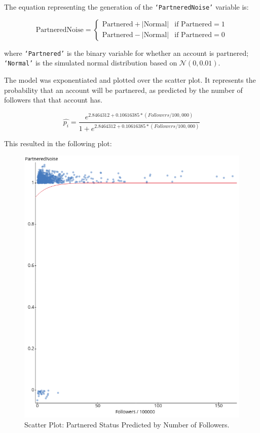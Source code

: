 \documentclass[12pt]{article}
\begin{document}
\noindent The equation representing the generation of the \texttt{`PartneredNoise'} variable is:

\begin{equation}
\text{PartneredNoise} = 
\begin{cases}
    \text{Partnered} + \lvert \text{Normal} \rvert & \text{if } \text{Partnered} = 1 \\
    \text{Partnered} - \lvert \text{Normal} \rvert & \text{if } \text{Partnered} = 0
\end{cases}
\end{equation}

\noindent where \texttt{`Partnered'} is the binary variable for whether an account is partnered; \texttt{`Normal'} is the simulated normal distribution based on $\mathcal{N}(0, 0.01)$.

The model was exponentiated and plotted over the scatter plot. It represents the probability that an account will be partnered, as predicted by the number of followers that that account has.

\begin{equation}
\hat{p_{i}} = \frac{e^{2.8464312 + 0.10616385 \ast (Followers/100,000)}}{1 + e^{2.8464312 + 0.10616385 \ast (Followers/100,000)}}
\end{equation}

This resulted in the following plot:

\begin{figure}[H]
\centering
	\includegraphics[width=0.75\linewidth]{../StatCrunch_Results/logit_partnered_followers/scatter_plot}
	\captionsetup{justification=centering, singlelinecheck=false, margin=2cm}
	\caption[Scatter Plot: Partnered Status Predicted by Number of Followers]{Scatter Plot: Partnered Status Predicted by Number of Followers.}
	\label{fig:logit_partnered_followers}
\end{figure}
\end{document}
